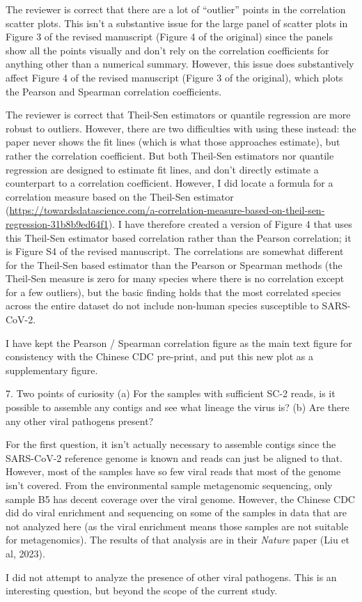 \documentclass[11pt, oneside]{article}   	%
\newcommand{\response}[1]{{\color{black}#1}}
\begin{document}
\response{
The reviewer is correct that there are a lot of ``outlier'' points in the correlation scatter plots.
This isn't a substantive issue for the large panel of scatter plots in Figure 3 of the revised manuscript (Figure 4 of the original) since the panels show all the points visually and don't rely on the correlation coefficients for anything other than a numerical summary.
However, this issue does substantively affect Figure 4 of the revised manuscript (Figure 3 of the original), which plots the Pearson and Spearman correlation coefficients.

The reviewer is correct that Theil-Sen estimators or quantile regression are more robust to outliers.
However, there are two difficulties with using these instead: the paper never shows the fit lines (which is what those approaches estimate), but rather the correlation coefficient.
But both Theil-Sen estimators nor quantile regression are designed to estimate fit lines, and don't directly estimate a counterpart to a correlation coefficient.
However, I did locate a formula for a correlation measure based on the Theil-Sen estimator (\url{https://towardsdatascience.com/a-correlation-measure-based-on-theil-sen-regression-31b8b9ed64f1}).
I have therefore created a version of Figure 4 that uses this Theil-Sen estimator based correlation rather than the Pearson correlation; it is Figure S4 of the revised manuscript.
The correlations are somewhat different for the Theil-Sen based estimator than the Pearson or Spearman methods (the Theil-Sen measure is zero for many species where there is no correlation except for a few outliers), but the basic finding holds that the most correlated species across the entire dataset do not include non-human species susceptible to SARS-CoV-2.

I have kept the Pearson / Spearman correlation figure as the main text figure for consistency with the Chinese CDC pre-print, and put this new plot as a supplementary figure.
}

7. Two points of curiosity
   (a) For the samples with sufficient SC-2 reads, is it possible to assemble any contigs and see what lineage the virus is?
   (b) Are there any other viral pathogens present?
   
\response{
For the first question, it isn't actually necessary to assemble contigs since the SARS-CoV-2 reference genome is known and reads can just be aligned to that.
However, most of the samples have so few viral reads that most of the genome isn't covered.
From the environmental sample metagenomic sequencing, only sample B5 has decent coverage over the viral genome.
However, the Chinese CDC did do viral enrichment and sequencing on some of the samples in data that are not analyzed here (as the viral enrichment means those samples are not suitable for metagenomics).
The results of that analysis are in their \textit{Nature} paper (Liu et al, 2023).

I did not attempt to analyze the presence of other viral pathogens.
This is an interesting question, but beyond the scope of the current study.
}
\end{document}
